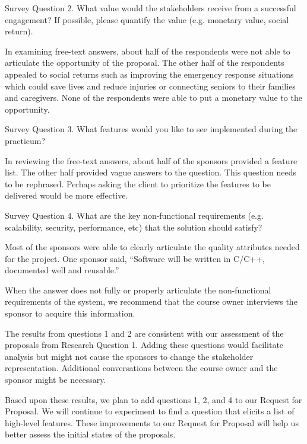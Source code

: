{Survey Question 2. What value would the stakeholders receive from a successful engagement? If possible, please quantify the value (e.g. monetary
value, social return).}

In examining free-text answers, about half of the respondents were not
able to articulate the opportunity of the proposal. The other half of
the respondents appealed to social returns such as improving the
emergency response situations which could save lives and reduce injuries
or connecting seniors to their families and caregivers. None of the
respondents were able to put a monetary value to the opportunity.

{Survey Question 3. What features would you like to see implemented during the
practicum? }

In reviewing the free-text answers, about half of the sponsors provided
a feature list. The other half provided vague answers to the question.
This question needs to be rephrased. Perhaps asking the client to
prioritize the features to be delivered would be more effective.

{Survey Question 4. What are the key non-functional requirements (e.g.
scalability, security, performance, etc) that the solution should
satisfy?}

Most of the sponsors were able to clearly articulate the quality
attributes needed for the project. One sponsor said, ``Software will be
written in C/C++, documented well and reusable.'' 

When the answer does not fully or properly articulate the
non-functional requirements of the system, we recommend that the course
owner interviews the sponsor to acquire this information. 

The results from questions 1 and 2 are consistent with our assessment
of the proposals from Research Question 1. Adding these questions would
facilitate analysis but might not cause the sponsors to change the
stakeholder representation. Additional conversations between the course 
owner and the sponsor might be necessary.

Based upon these results, we plan to add questions 1, 2, and 4 to our
Request for Proposal. We will continue to experiment to find a question
that elicits a list of high-level features. These improvements to
our Request for Proposal will help us better assess the initial states
of the proposals.


